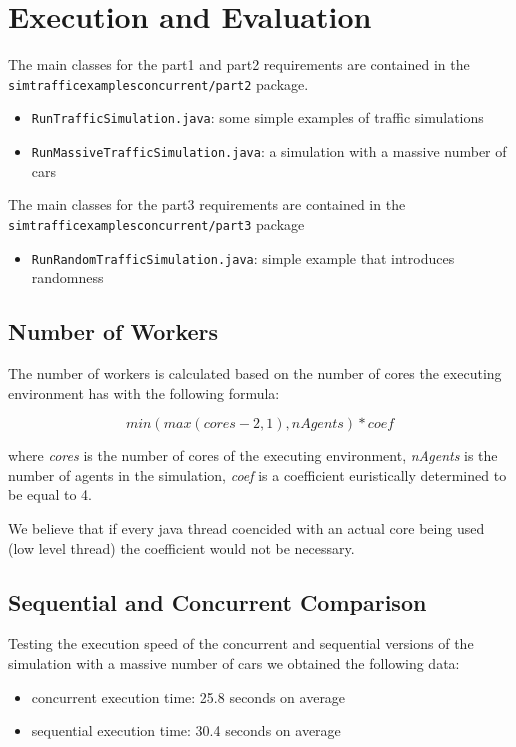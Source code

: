 \documentclass[12pt, a4paper]{report}
\begin{document}
\chapter{Execution and Evaluation}
The main classes for the part1 and part2 requirements are contained in the \texttt{simtrafficexamplesconcurrent/part2} package.
\begin{itemize}
    \item \texttt{RunTrafficSimulation.java}: some simple examples of traffic simulations
    \item \texttt{RunMassiveTrafficSimulation.java}: a simulation with a massive number of cars
\end{itemize}

The main classes for the part3 requirements are contained in the\\ \texttt{simtrafficexamplesconcurrent/part3} package
\begin{itemize}
    \item \texttt{RunRandomTrafficSimulation.java}: simple example that introduces randomness
\end{itemize}

\section{Number of Workers}
The number of workers  is calculated based on the number of cores the executing environment has with the following
 formula:

\[min(max(cores - 2, 1), nAgents) * coef\]

where \emph{cores} is the number of cores of the executing environment, \emph{nAgents} is the number of agents in the simulation,
 \emph{coef} is a coefficient euristically determined to be equal to 4.

We believe that if every java thread coencided with an actual core being used (low level thread) the coefficient
 would not be necessary. 

\section{Sequential and Concurrent Comparison}
Testing the execution speed of the concurrent and sequential versions of the simulation with a massive number of cars
 we obtained the following data:
\begin{itemize}
    \item concurrent execution time: 25.8 seconds on average
    \item sequential execution time: 30.4 seconds on average
\end{itemize}
\end{document}
